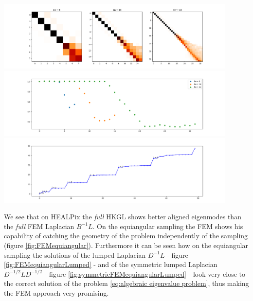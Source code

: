 \begin{minipage}[t!]{.45\textwidth}
	\raggedright
	\center
	\centering
	\includegraphics[width=0.9\textwidth]{../codes/03.FEM_laplacian/equiangular/mass_lumping/BLB/img/linearFEM.png}
	\includegraphics[width=0.9\textwidth]{../codes/03.FEM_laplacian/equiangular/mass_lumping/BLB/img/linearFEM_diagonal.png}	
	\includegraphics[width=0.9\textwidth]{../codes/03.FEM_laplacian/equiangular/mass_lumping/BLB/img/FEM_eigenvalues_32.png}	
\end{minipage}

We see that on HEALPix the \textit{full} HKGL shows better aligned eigenmodes than the \textit{full} FEM Laplacian $B^{-1}L$. On the equiangular sampling the FEM shows his capability of catching the geometry of the problem independently of the sampling (figure \ref{fig:FEMequiangular}). Furthermore it can be seen how on the equiangular sampling the solutions of the lumped Laplacian $D^{-1}L$ - figure \ref{fig:FEMequiangularLumped} - and of the symmetric lumped Laplacian $D^{-1/2}LD^{-1/2}$ - figure \ref{fig:symmetricFEMequiangularLumped} - look very close to the correct solution of the problem \ref{eq:algebraic  eigenvalue problem}, thus making the FEM approach very promising.



